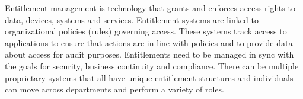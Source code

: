 %
%
Entitlement management is technology that grants and enforces access rights to data,
devices, systems and services.
Entitlement systems are linked to organizational policies (rules) governing access.
These systems track access to applications to ensure that actions are in line with policies and to provide data
about access for audit purposes.
Entitlements need to be managed in sync with the goals for security, business continuity and compliance.
There can be multiple proprietary systems that all have unique entitlement structures and
individuals can move across departments and perform a variety of roles.

